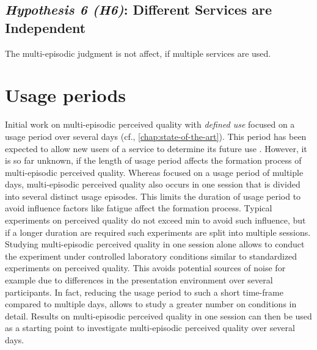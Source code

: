 \subsection*{\emph{Hypothesis 6 (H6)}: Different Services are Independent}
\begin{hypothesis}[Hypothesis H5]
The multi-episodic judgment is not affect, if multiple services are used.
\end{hypothesis}


\section{Usage periods}
Initial work on multi-episodic perceived quality with \emph{defined use} focused on a usage period over several days (cf., \autoref{chap:state-of-the-art}). 
This period has been expected to allow new users of a service to determine its future use \citep[cf.,][]{moller_single-call_2011}.
However, it is so far unknown, if the length of usage period affects the formation process of multi-episodic perceived quality.
Whereas \cite{moller_single-call_2011} focused on a usage period of multiple days, multi-episodic perceived quality also occurs in one session that is divided into several distinct usage episodes.
This limits the duration of usage period to avoid influence factors like fatigue affect the formation process.
Typical experiments on perceived quality do not exceed \unit[90]{min} to avoid such influence, but if a longer duration are required such experiments are split into multiple sessions.
Studying multi-episodic perceived quality in one session alone allows to conduct the experiment under controlled laboratory conditions similar to standardized experiments on perceived quality.
This avoids potential sources of noise for example due to differences in the presentation environment over several participants.
In fact, reducing the usage period to such a short time-frame compared to multiple days, allows to study a greater number on conditions in detail.
Results on multi-episodic perceived quality in one session can then be used as a starting point to investigate multi-episodic perceived quality over several days.

